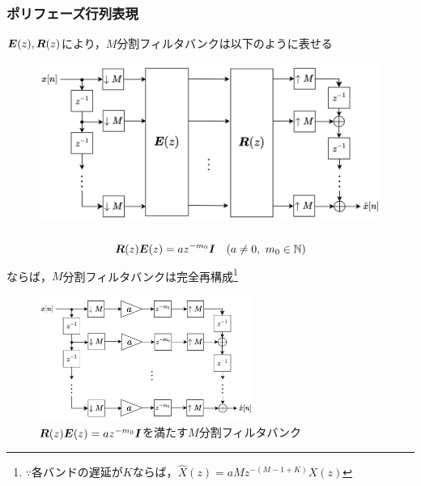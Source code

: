 \documentclass[14pt,xcolor=dvipsnames,table,dvipdfmx]{beamer}
\begin{document}
\begin{frame}[c]
    \frametitle{ポリフェーズ行列表現}
    $\boldsymbol{E}(z), \boldsymbol{R}(z)$により，$M$分割フィルタバンクは以下のように表せる
    \vspace{-13pt}
    \begin{figure}
        \includegraphics[width=120mm]{./figs/polyphase_representation_filter_bank.drawio.png}
    \end{figure}
\end{frame}

\begin{frame}[c]
    \frametitle{}
    \begin{block}{}
        \vspace{-14pt}
        \begin{align}
            \ve{R}(z) \ve{E}(z) = a z^{-m_{0}} \ve{I} \quad (a \neq 0,\ m_{0} \in \mathbb{N}) \label{eq:filter_bank_PR_condition}
        \end{align}
        ならば，$M$分割フィルタバンクは完全再構成\footnote{$\because$各バンドの遅延が$K$ならば，$\hat{X}(z) = aM z^{-(M - 1 + K)}X(z)$}
    \end{block}
    \begin{figure}
        \includegraphics[width=70mm]{./figs/perfect_reconstraction_filter_bank.drawio.png}
        \caption*{$\boldsymbol{R}(z) \boldsymbol{E}(z) = a z^{-m_{0}} \boldsymbol{I}$を満たす$M$分割フィルタバンク}
    \end{figure}
\end{frame}
\end{document}
